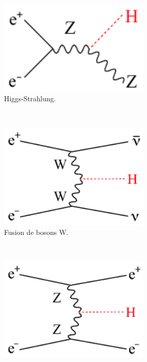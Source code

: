 \documentclass[a4papper, 10pt]{article}
\begin{document}
    \begin{figure}  
        \centering
        \begin{subfigure}[t]{0.3\textwidth}
            \includegraphics[width = 0.8\textwidth]{Pictures/Chapter_Theory_figs_ZHdiagram.png}
            \caption{Higgs-Strahlung.}
            \label{fig:higgsStrahlung}
        \end{subfigure}
        ~%
        \begin{subfigure}[t]{0.3\textwidth}
            \includegraphics[width = 0.8\textwidth]{Pictures/Chapter_Theory_figs_nunuHdiagram.png}
            \caption{Fusion de bosons W.}
            \label{fig:WW-fusion}
        \end{subfigure}
        ~%
        \begin{subfigure}[t]{0.3\textwidth}
            \includegraphics[width = 0.8\textwidth]{Pictures/HiggsProd_eeH.png}

\end{subfigure}
\end{figure}
\end{document}
